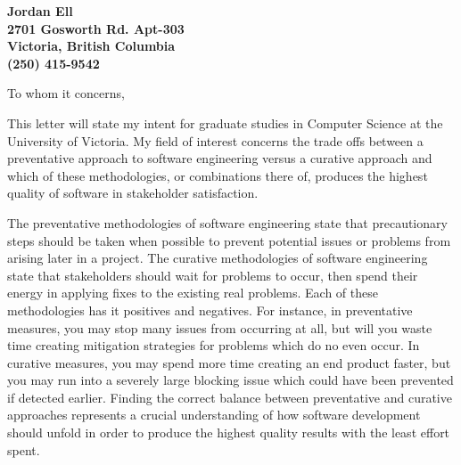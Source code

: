\documentclass[11pt]{letter} %
\begin{document}

\begin{letter}{} 


\begin{center}
\large\bf Jordan Ell \\ %
2701 Gosworth Rd. Apt-303 \\ Victoria, British Columbia\\ (250) 415-9542 %
\end{center} 
\vfill

\signature{Jordan Ell} %


\opening{To whom it concerns,} 

This letter will state my intent for graduate studies in Computer Science at the University of Victoria. My field of interest concerns the trade offs between a preventative approach to software engineering versus a curative approach and which of these methodologies, or combinations there of, produces the highest quality of software in stakeholder satisfaction.

The preventative methodologies of software engineering state that precautionary steps should be taken when possible to prevent potential issues or problems from arising later in a project. The curative methodologies of software engineering state that stakeholders should wait for problems to occur, then spend their energy in applying fixes to the existing real problems. Each of these methodologies has it positives and negatives. For instance, in preventative measures, you may stop many issues from occurring at all, but will you waste time creating mitigation strategies for problems which do no even occur. In curative measures, you may spend more time creating an end product faster, but you may run into a severely large blocking issue which could have been prevented if detected earlier. Finding the correct balance between preventative and curative approaches represents a crucial understanding of how software development should unfold in order to produce the highest quality results with the least effort spent.


\end{letter}
\end{document}
